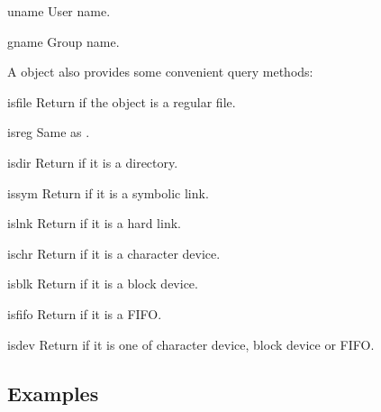 \begin{memberdesc}{uname}
    User name.
\end{memberdesc}

\begin{memberdesc}{gname}
    Group name.
\end{memberdesc}

A  object also provides some convenient query methods:

\begin{methoddesc}{isfile}{}
    Return  if the  object is a regular
    file.
\end{methoddesc}

\begin{methoddesc}{isreg}{}
    Same as .
\end{methoddesc}

\begin{methoddesc}{isdir}{}
    Return  if it is a directory.
\end{methoddesc}

\begin{methoddesc}{issym}{}
    Return  if it is a symbolic link.
\end{methoddesc}

\begin{methoddesc}{islnk}{}
    Return  if it is a hard link.
\end{methoddesc}

\begin{methoddesc}{ischr}{}
    Return  if it is a character device.
\end{methoddesc}

\begin{methoddesc}{isblk}{}
    Return  if it is a block device.
\end{methoddesc}

\begin{methoddesc}{isfifo}{}
    Return  if it is a FIFO.
\end{methoddesc}

\begin{methoddesc}{isdev}{}
    Return  if it is one of character device, block
    device or FIFO.
\end{methoddesc}


\subsection{Examples \label{tar-examples}}

